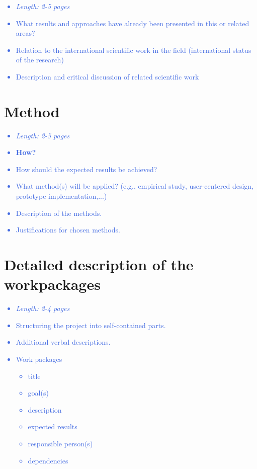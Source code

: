 \documentclass[a4paper,11pt]{article}
\providecommand*{\note}[1]{\small \textcolor{RoyalBlue}{\begin{minipage}{\textwidth}{#1}\end{minipage}}}
\begin{document}
\note{
\begin{itemize}
\item {\em Length: 2-5 pages}
\item What results and approaches have already been presented in this or related areas?
\item Relation to the international scientific work in the field (international status of the research)
\item Description and critical discussion of related scientific work
\end{itemize}
}

\section{Method}
\label{sect:method}

\note{
\begin{itemize}
\item {\em Length: 2-5 pages}
\item {\bf How?}
\item How should the expected results be achieved?
\item What method(s) will be applied? (e.g., empirical study, user-centered design, prototype implementation,...)
\item Description of the methods.
\item Justifications for chosen methods.
\end{itemize}
}

\section{Detailed description of the workpackages}
\label{sect:workplan}

\note{
\begin{itemize}
\item {\em Length: 2-4 pages}
\item Structuring the project into self-contained parts.
\item Additional verbal descriptions.
\item Work packages
    \begin{itemize}
    \item title
    \item goal(s)
    \item description
    \item expected results
    \item responsible person(s)
    \item dependencies
    \end{itemize}
\end{itemize}
}
\end{document}
